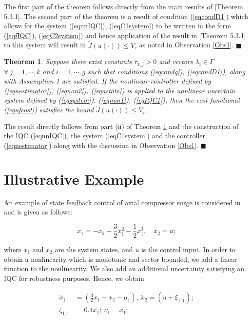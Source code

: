 \documentclass[twocolumn]{autart}
\newtheorem{theorem}{Theorem}
\newcommand{\startproof}{\vspace{0.01cm} \noindent {\bf \em Proof: }}
\newcommand{\finishproof}{\hfill $\blacksquare$}
\begin{document}
\vspace{0.9mm}
\startproof
The first part of the theorem follows directly from the main results of \cite{IP} [Theorem 5.3.1]. The second part of the theorem is a result of  condition (\ref{eqcondD1}) which allows for the system (\ref{eqnnIQC}), (\ref{eqC1system}) to be written in the form  (\ref{eqfIQC}), (\ref{eqC2system}) and hence application of the result in \cite{IP} [Theorem 5.3.1] to this system will result in $\tilde{J}(u(\cdot))\leq V_\tau$ as noted in Observation \ref{Obs1}.
\finishproof
\begin{theorem}\label{th1}
Suppose there exist constants $\tau_{1,j}>0$ and vectors $\lambda_i \in \Gamma$ $\forall~j=1,\cdots,k$ and $i=1,\cdots,g$ such that conditions (\ref{eqcondq}), (\ref{eqcondD1}), along with Assumption 1 are satisfied.  If the nonlinear controller defined by (\ref{eqnestimator}), (\ref{eqnon2}), (\ref{eqnstate}) is applied to the nonlinear uncertain system defined by (\ref{eqsystem}), (\ref{eqnon1}), (\ref{eqIQC1}), then the cost functional (\ref{eqnfcost}) satisfies the bound $\tilde{J}(u(\cdot))\leq V_\tau$.
\end{theorem}
\vspace{0.25mm}
\startproof
The result directly follows from part (ii) of Theorem \ref{th1} and the construction of the IQC (\ref{eqnnIQC}), the system (\ref{eqC1system}) and the controller (\ref{eqnestimator}) along with the discussion in Observation \ref{Obs1}.
\finishproof
\section{Illustrative Example}\label{sec:example}
\vspace{0.25mm}
An example of state feedback control of axial compressor surge is considered in \cite{outputfeedback_petersen,Arcak_example,Krstic_Adaptive} and is given as follows:
\begin{small}
\begin{equation}
\dot{x}_1=-x_2-\frac{3}{2} x_1^2-\frac{1}{2}x_1^3, \quad \dot{x}_2=u;
\end{equation}
\end{small}

\noindent where $x_1$ and $x_2$ are the system states, and $u$ is the control input. In order to obtain a nonlinearity which is monotonic and sector bounded, we add a linear function to the nonlinearity. We also add an additional uncertainty satisfying an IQC for robustness purposes. Hence, we obtain
\begin{small} 
\begin{equation}
\begin{split}
\dot{x}_1&=(\frac{3}{2}x_1-x_2-\mu_1),~\dot{x}_2=(u+\xi_{1,1});\\
\zeta_{1,1}&=0.1 x_1; ~\nu_1=x_1;
\end{split}
\end{equation}
\end{small}
\end{document}
